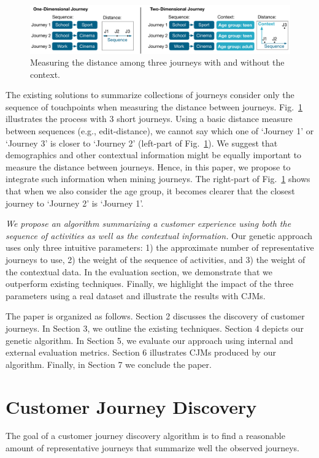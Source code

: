\documentclass[runningheads]{llncs}
\begin{document}
\begin{figure}[H]
\centering
\includegraphics[width=1\columnwidth]{05_schema/context1.pdf}
\caption{Measuring the distance among three journeys with and without the context.}
\label{context1}
\end{figure}

The existing solutions to summarize collections of journeys \cite{gabadinho2009summarizing,bernard2019genetic} consider only the sequence of touchpoints when measuring the distance between journeys. Fig.~\ref{context1} illustrates the process with 3 short journeys. Using a basic distance measure between sequences (e.g., edit-distance), we cannot say which one of `Journey 1' or `Journey 3' is closer to `Journey 2' (left-part of Fig.~\ref{context1}). We suggest that demographics and other contextual information might be equally important to measure the distance between journeys. Hence, in this paper, we propose to integrate such information when mining journeys. The right-part of Fig.~\ref{context1} shows that when we also consider the age group, it becomes clearer that the closest journey to `Journey 2' is `Journey 1'.

{\it We propose an algorithm summarizing a customer experience using both the sequence of activities as well as the contextual information.} Our genetic approach uses only three intuitive parameters: 1) the approximate number of representative journeys to use, 2) the weight of the sequence of activities, and 3) the weight of the contextual data. In the evaluation section, we demonstrate that we outperform existing techniques. Finally, we highlight the impact of the three parameters using a real dataset and illustrate the results with CJMs. 

The paper is organized as follows. Section 2 discusses the discovery of customer journeys. In Section 3, we outline the existing techniques. Section 4 depicts our genetic algorithm. In Section 5, we evaluate our approach using internal and external evaluation metrics. Section 6 illustrates CJMs produced by our algorithm. Finally, in Section 7 we conclude the paper. 


\section{Customer Journey Discovery}
The goal of a customer journey discovery algorithm is to find a reasonable amount of representative journeys that summarize well the observed journeys. 
\end{document}

